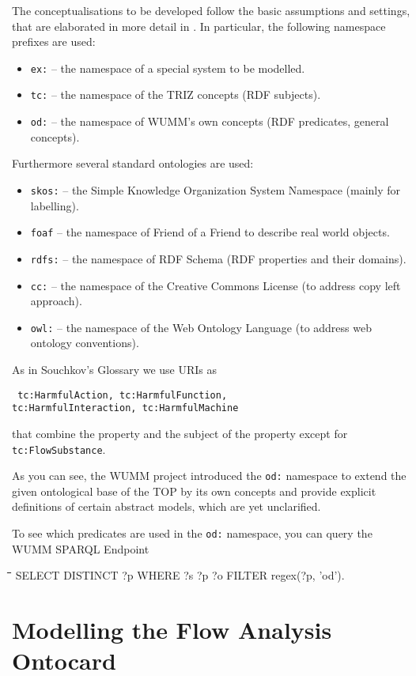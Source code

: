 \documentclass[a4paper,11pt]{article}
\newenvironment{code}{\tt \begin{tabbing}
\hskip12pt\=\hskip12pt\=\hskip12pt\=\hskip12pt\=\hskip5cm\=\hskip5cm\=\kill}
{\end{tabbing}}
\begin{document}
The conceptualisations to be developed follow the basic assumptions and
settings, that are elaborated in more detail in \cite{Graebe2021}. In
particular, the following namespace prefixes are used:
\begin{itemize}[noitemsep]
\item \texttt{ex:} -- the namespace of a special system to be modelled. 
\item \texttt{tc:} -- the namespace of the TRIZ concepts (RDF subjects).
\item \texttt{od:} -- the namespace of WUMM's own concepts (RDF predicates,
  general concepts).
\end{itemize}
Furthermore several standard ontologies are used:
\begin{itemize}[noitemsep]
\item \texttt{skos:} -- the Simple Knowledge Organization System Namespace
  (mainly for labelling).
\item \texttt{foaf} -- the namespace of Friend of a Friend to describe real
  world objects.
\item \texttt{rdfs:} -- the namespace of RDF Schema (RDF properties and their
  domains).
\item \texttt{cc:} -- the namespace of the Creative Commons License (to
  address copy left approach).
\item \texttt{owl:} -- the namespace of the Web Ontology Language (to address
  web ontology conventions).
\end{itemize}

As in Souchkov's Glossary we use URIs as 
\begin{center}\tt
  tc:HarmfulAction, tc:HarmfulFunction,\\ tc:HarmfulInteraction,
  tc:HarmfulMachine
\end{center}
that combine the property and the subject of the property except for
\texttt{tc:FlowSubstance}.

As you can see, the WUMM project introduced the \texttt{od:} namespace to
extend the given ontological base of the TOP by its own concepts and provide
explicit definitions of certain abstract models, which are yet unclarified.

To see which predicates are used in the \texttt{od:} namespace, you can
query the WUMM SPARQL Endpoint \cite{SPARQL} 
\begin{code}
\> SELECT DISTINCT ?p WHERE {?s ?p ?o FILTER regex(?p, 'od')}.
\end{code}

\section{Modelling the Flow Analysis Ontocard}
\end{document}
